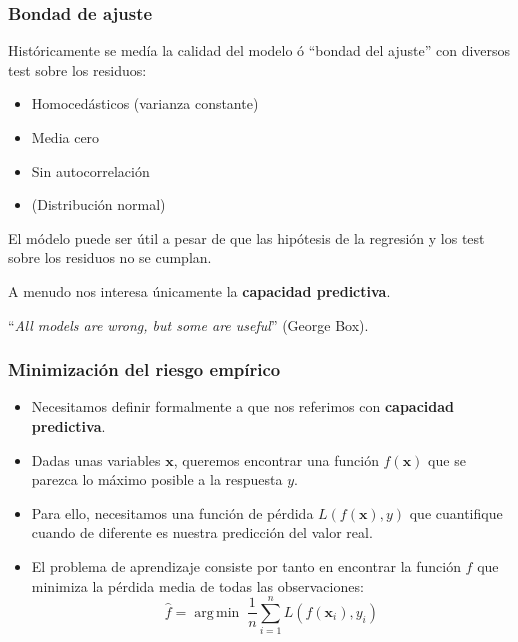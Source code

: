 \documentclass{beamer}
\newcommand{\xbf}{\ensuremath{\mathbf{x}}}
\DeclareMathOperator*{\argmin}{arg\,min}
\newenvironment{wideitemize}{\itemize\addtolength{\itemsep}{12pt}}{\enditemize}
\begin{document}
\begin{frame}
\frametitle{Bondad de ajuste}

\begin{wideitemize}
\item Históricamente se medía la calidad del modelo ó ``bondad del ajuste'' con diversos test sobre los residuos:
\begin{itemize}
\item Homocedásticos (varianza constante)
\item Media cero
\item Sin autocorrelación
\item (Distribución normal)
\end{itemize}


\item El módelo puede ser útil a pesar de que las hipótesis de la regresión y los test sobre los residuos no se cumplan.

\item A menudo nos interesa únicamente la \textbf{capacidad predictiva}.

\item ``\textit{All models are wrong, but some are useful}'' (George Box).
\end{wideitemize}
\end{frame}

\begin{frame}
\frametitle{Minimización del riesgo empírico}

\begin{itemize}
\item Necesitamos definir formalmente a que nos referimos con \textbf{capacidad predictiva}.

\item Dadas unas variables $\xbf$, queremos encontrar una función $f(\xbf)$ que se parezca lo máximo posible a la respuesta $y$.

\item Para ello, necesitamos una función de pérdida $L(f(\xbf), y)$ que cuantifique cuando de diferente es nuestra predicción del valor real.

\item El problema de aprendizaje consiste por tanto en encontrar la función $f$ que minimiza la pérdida media de todas las observaciones: $$\hat{f} = \argmin\; \frac{1}{n}\sum_{i=1}^{n}{L(f(\xbf_i), y_i)}$$
\end{itemize}
\end{frame}
\end{document}
